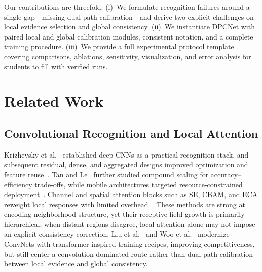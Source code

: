 \documentclass[11pt,a4paper]{article}
\begin{document}
Our contributions are threefold.
(i)~We formulate recognition failures around a single gap---missing dual-path calibration---and derive two explicit challenges on local evidence selection and global consistency.
(ii)~We instantiate DPCNet with paired local and global calibration modules, consistent notation, and a complete training procedure.
(iii)~We provide a full experimental protocol template covering comparisons, ablations, sensitivity, visualization, and error analysis for students to fill with verified runs.


\section{Related Work}
\label{sec:rw}

\subsection{Convolutional Recognition and Local Attention}
Krizhevsky et al.~\cite{krizhevsky2012alexnet} established deep CNNs as a practical recognition stack, and subsequent residual, dense, and aggregated designs improved optimization and feature reuse~\cite{he2016resnet,huang2017densenet,xie2017resnext}.
Tan and Le~\cite{tan2019efficientnet} further studied compound scaling for accuracy--efficiency trade-offs, while mobile architectures targeted resource-constrained deployment~\cite{howard2017mobilenets,sandler2018mobilenetv2}.
Channel and spatial attention blocks such as SE, CBAM, and ECA reweight local responses with limited overhead~\cite{hu2018senet,woo2018cbam,wang2020eca}.
These methods are strong at encoding neighborhood structure, yet their receptive-field growth is primarily hierarchical; when distant regions disagree, local attention alone may not impose an explicit consistency correction.
Liu et al.~\cite{liu2022convnext} and Woo et al.~\cite{woo2023convnextv2} modernize ConvNets with transformer-inspired training recipes, improving competitiveness, but still center a convolution-dominated route rather than dual-path calibration between local evidence and global consistency.
\end{document}
